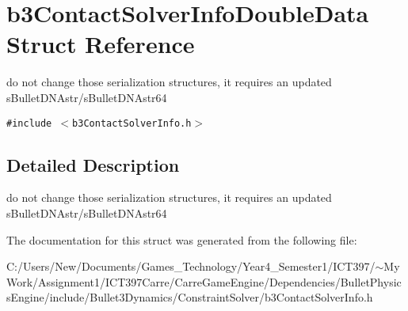 \hypertarget{structb3_contact_solver_info_double_data}{
\section{b3ContactSolverInfoDoubleData Struct Reference}
\label{structb3_contact_solver_info_double_data}
}
do not change those serialization structures, it requires an updated sBulletDNAstr/sBulletDNAstr64  


{\tt \#include $<$b3ContactSolverInfo.h$>$}



\subsection{Detailed Description}
do not change those serialization structures, it requires an updated sBulletDNAstr/sBulletDNAstr64 

The documentation for this struct was generated from the following file:\begin{CompactItemize}
\item 
C:/Users/New/Documents/Games\_\-Technology/Year4\_\-Semester1/ICT397/$\sim$My Work/Assignment1/ICT397Carre/CarreGameEngine/Dependencies/BulletPhysicsEngine/include/Bullet3Dynamics/ConstraintSolver/b3ContactSolverInfo.h\end{CompactItemize}

